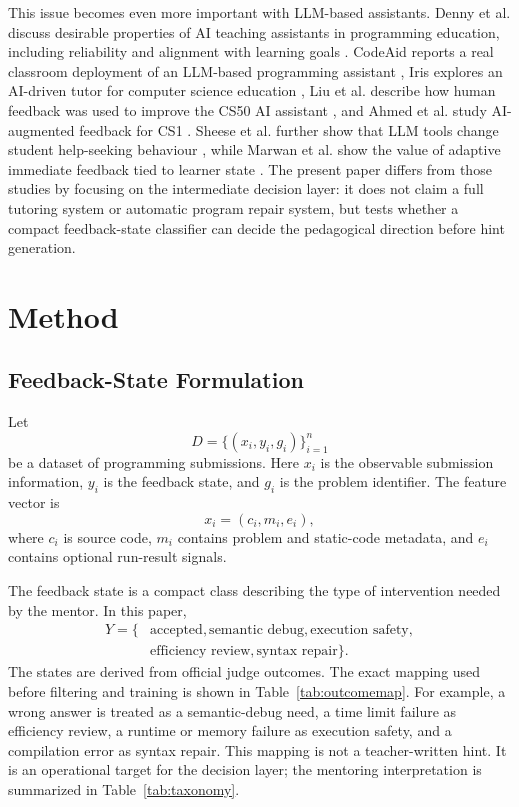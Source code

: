 \documentclass[conference]{IEEEtran}
\begin{document}
This issue becomes even more important with LLM-based assistants. Denny et al. discuss desirable properties of AI teaching assistants in programming education, including reliability and alignment with learning goals \cite{Denny2024}. CodeAid reports a real classroom deployment of an LLM-based programming assistant \cite{CodeAid2024}, Iris explores an AI-driven tutor for computer science education \cite{Iris2024}, Liu et al. describe how human feedback was used to improve the CS50 AI assistant \cite{Liu2025}, and Ahmed et al. study AI-augmented feedback for CS1 \cite{Ahamed2025}. Sheese et al. further show that LLM tools change student help-seeking behaviour \cite{Sheese2024}, while Marwan et al. show the value of adaptive immediate feedback tied to learner state \cite{Marwan2022}. The present paper differs from those studies by focusing on the intermediate decision layer: it does not claim a full tutoring system or automatic program repair system, but tests whether a compact feedback-state classifier can decide the pedagogical direction before hint generation.

\section{Method}

\subsection{Feedback-State Formulation}

Let
\[
D=\{(x_i,y_i,g_i)\}_{i=1}^{n}
\]
be a dataset of programming submissions. Here $x_i$ is the observable submission information, $y_i$ is the feedback state, and $g_i$ is the problem identifier. The feature vector is
\[
x_i=(c_i,m_i,e_i),
\]
where $c_i$ is source code, $m_i$ contains problem and static-code metadata, and $e_i$ contains optional run-result signals.

The feedback state is a compact class describing the type of intervention needed by the mentor. In this paper,
\[
\begin{aligned}
Y=\{&\text{accepted},\text{semantic debug},\text{execution safety},\\
&\text{efficiency review},\text{syntax repair}\}.
\end{aligned}
\]
The states are derived from official judge outcomes. The exact mapping used before filtering and training is shown in Table~\ref{tab:outcomemap}. For example, a wrong answer is treated as a semantic-debug need, a time limit failure as efficiency review, a runtime or memory failure as execution safety, and a compilation error as syntax repair. This mapping is not a teacher-written hint. It is an operational target for the decision layer; the mentoring interpretation is summarized in Table~\ref{tab:taxonomy}.
\end{document}
